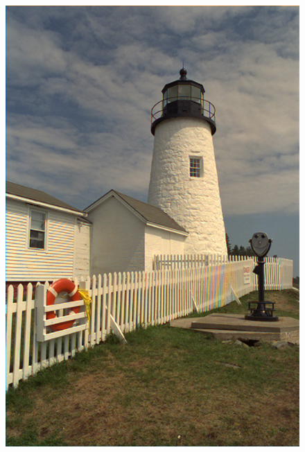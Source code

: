 \documentclass[a4paper,12pt]{report}
\begin{document}
\begin{figure}[!ht]
	\center
	\includegraphics[scale=0.4]{./image/part3-31.png}

\end{figure}
\end{document}
